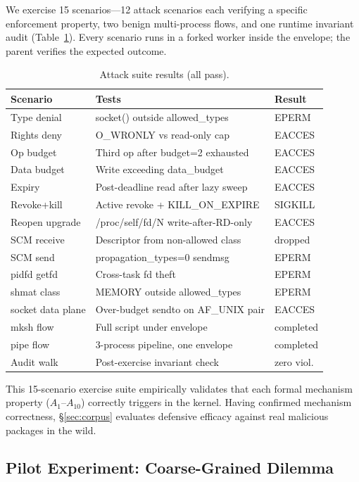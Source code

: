 \documentclass[letterpaper,twocolumn,10pt]{article}
\begin{document}
We exercise 15 scenarios---12 attack scenarios each verifying a specific
enforcement property, two benign multi-process flows, and one runtime
invariant audit (Table~\ref{tab:attacks}).  Every scenario runs
in a forked worker inside the envelope; the parent verifies the
expected outcome.

\begin{table}[t]
\centering
\caption{Attack suite results (all pass).}
\label{tab:attacks}
\footnotesize
\begin{tabular}{@{}lp{3.6cm}l@{}}
\toprule
\textbf{Scenario} & \textbf{Tests} & \textbf{Result} \\
\midrule
Type denial & socket() outside allowed\_types & EPERM \\
Rights deny & O\_WRONLY vs read-only cap & EACCES \\
Op budget & Third op after budget=2 exhausted & EACCES \\
Data budget & Write exceeding data\_budget & EACCES \\
Expiry & Post-deadline read after lazy sweep & EACCES \\
Revoke+kill & Active revoke + KILL\_ON\_EXPIRE & SIGKILL \\
Reopen upgrade & /proc/self/fd/N write-after-RD-only & EACCES \\
SCM receive & Descriptor from non-allowed class & dropped \\
SCM send & propagation\_types=0 sendmsg & EPERM \\
pidfd getfd & Cross-task fd theft & EPERM \\
shmat class & MEMORY outside allowed\_types & EPERM \\
socket data plane & Over-budget sendto on AF\_UNIX pair & EACCES \\
mksh flow & Full script under envelope & completed \\
pipe flow & 3-process pipeline, one envelope & completed \\
Audit walk & Post-exercise invariant check & zero viol. \\
\bottomrule
\end{tabular}
\end{table}

This 15-scenario exercise suite empirically validates that each formal
mechanism property ($A_1$--$A_{10}$) correctly triggers in the kernel.
Having confirmed mechanism correctness, \S\ref{sec:corpus} evaluates
defensive efficacy against real malicious packages in the wild.

\subsection{Pilot Experiment: Coarse-Grained Dilemma}
\end{document}
